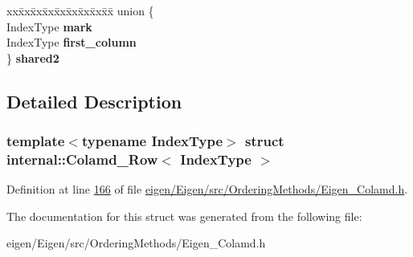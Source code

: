\begin{DoxyCompactItemize}
\begin{tabbing}
\end{tabbing}\item 
\mbox{\label{structinternal_1_1_colamd___row_ae48b55c7d1cf16f3bc561627007b06ea}} 
\begin{tabbing}
xx\=xx\=xx\=xx\=xx\=xx\=xx\=xx\=xx\=\kill
union \{\\
\>IndexType {\bfseries mark}\\
\>IndexType {\bfseries first\_column}\\
\} {\bfseries shared2}\\

\end{tabbing}\end{DoxyCompactItemize}


\subsection{Detailed Description}
\subsubsection*{template$<$typename Index\+Type$>$\newline
struct internal\+::\+Colamd\+\_\+\+Row$<$ Index\+Type $>$}



Definition at line \hyperlink{eigen_2_eigen_2src_2_ordering_methods_2_eigen___colamd_8h_source_l00166}{166} of file \hyperlink{eigen_2_eigen_2src_2_ordering_methods_2_eigen___colamd_8h_source}{eigen/\+Eigen/src/\+Ordering\+Methods/\+Eigen\+\_\+\+Colamd.\+h}.



The documentation for this struct was generated from the following file\+:\begin{DoxyCompactItemize}
\item 
eigen/\+Eigen/src/\+Ordering\+Methods/\+Eigen\+\_\+\+Colamd.\+h\end{DoxyCompactItemize}
